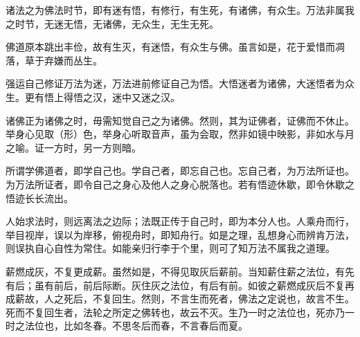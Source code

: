 


诸法之为佛法时节，即有迷有悟，有修行，有生死，有诸佛，有众生。万法非属我之时节，无迷无悟，无诸佛，无众生，无生无死。

佛道原本跳出丰俭，故有生灭，有迷悟，有众生与佛。虽言如是，花于爱惜而凋落，草于弃嫌而丛生。

强运自己修证万法为迷，万法进前修证自己为悟。大悟迷者为诸佛，大迷悟者为众生。更有悟上得悟之汉，迷中又迷之汉。

诸佛正为诸佛之时，毋需知觉自己之为诸佛。然则，其为证佛者，证佛而不休止。举身心见取（形）色，举身心听取音声，虽为会取，然非如镜中映影，非如水与月之喻。证一方时，另一方则暗。

所谓学佛道者，即学自己也。学自己者，即忘自己也。忘自己者，为万法所证也。为万法所证者，即令自己之身心及他人之身心脱落也。若有悟迹休歇，即令休歇之悟迹长长流出。

人始求法时，则远离法之边际；法既正传于自己时，即为本分人也。人乘舟而行，举目视岸，误以为岸移，俯视舟时，即知舟行。如是之理，乱想身心而辨肯万法，则误执自心自性为常住。如能亲归行李于个里，则可了知万法不属我之道理。

薪燃成灰，不复更成薪。虽然如是，不得见取灰后薪前。当知薪住薪之法位，有先有后；虽有前后，前后际断。灰住灰之法位，有后有前。如彼之薪燃成灰后不复再成薪故，人之死后，不复回生。然则，不言生而死者，佛法之定说也，故言不生。死而不复回生者，法轮之所定之佛转也，故云不灭。生乃一时之法位也，死亦乃一时之法位也，比如冬春。不思冬后而春，不言春后而夏。

\endchapter
